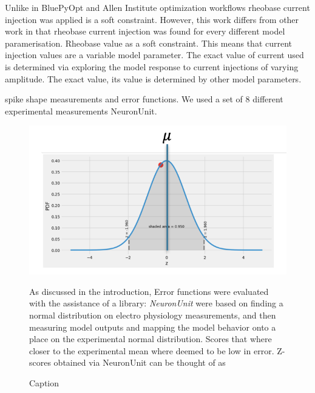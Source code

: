 Unlike in BluePyOpt \cite{bluepyopt} and Allen Institute optimization workflows \cite{gouwens} rheobase current injection was applied is a soft constraint. However, this work differs from other work in that rheobase current injection was found for every different model paramerisation.
Rheobase value as a soft constraint. This means that current injection values are a variable model parameter. The exact value of current used is determined via exploring the model response to current injections of varying amplitude. The exact value, its value is determined by other model parameters.

spike shape measurements and error functions. We used a set of 8 different experimental measurements NeuronUnit.


\begin{figure}
\begin{center}
	\includegraphics{figures/normal_distribution}
    \caption{As discussed in the introduction, Error functions were evaluated with the assistance of a library: \emph{NeuronUnit} 
    were based on finding a normal distribution on electro physiology measurements, 
    and then measuring model outputs and mapping the model behavior onto
     a place on the experimental normal distribution. Scores that where closer to the
      experimental mean where deemed to be low in error.
	Z-scores obtained via NeuronUnit can be thought of as  }
	
\caption{Caption}
\end{center}
	
\end{figure}
